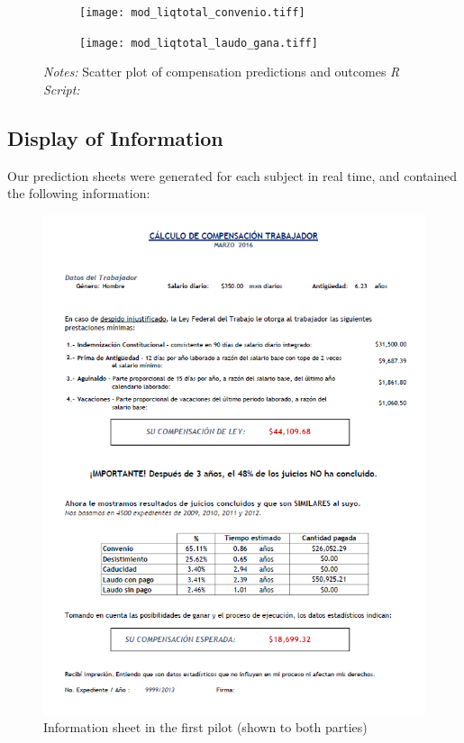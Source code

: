 \documentclass[]{article}
\begin{document}
\begin{figure}[H]
    \caption{Compensation predictions in the first pilot}
    \label{}
    \begin{center}
    \begin{subfigure}{0.49\textwidth}
    \centering
        \texttt{[image: mod\_liqtotal\_convenio.tiff]}
     \end{subfigure}
     \begin{subfigure}{0.49\textwidth}
    \centering
        \texttt{[image: mod\_liqtotal\_laudo\_gana.tiff]}
     \end{subfigure}
  \end{center}
        {\footnotesize \textit{Notes: } Scatter plot of compensation predictions and outcomes }
        {\footnotesize \textit{R Script: } \texttt{}}
\end{figure}


\subsection{Display of Information}\label{display-of-information}

Our prediction sheets were generated for each subject in real time, and
contained the following information:

\begin{figure}[H]
\centering
\caption{Information sheet in the first pilot (shown to both parties)}
\includegraphics{calctreat.png}
\end{figure}
\end{document}
